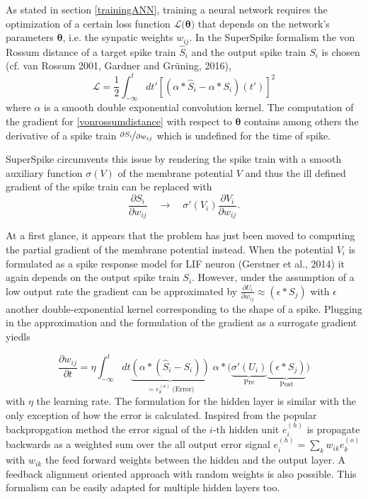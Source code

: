 As stated in section \ref{trainingANN}, training a neural network requires the optimization of a certain loss function $\mathcal{L(\mathbf{\theta)}}$ that depends on the network's parameters $\mathbf{\theta}$, i.e. the synpatic weights $w_{ij}$. In the SuperSpike formalism the von Rossum distance of a target spike train $\hat{S}_i$ and the output spike train $S_i$ is chosen (cf. van Rossum 2001, Gardner and Grüning, 2016),
\begin{equation}
\label{vonrossumdistance}
\mathcal{L} = \frac{1}{2} \int^t_{-\infty}dt' \left[\left(\alpha \ast \hat{S}_i - \alpha \ast S_i \right)(t')\right]^2
\end{equation}
where $\alpha$ is a smooth double exponential convolution kernel. The computation of the gradient for \ref{vonrossumdistance} with respect to $\mathbf{\theta}$ contains among others the derivative of a spike train $\nicefrac{\partial{S_i}}{\partial{w_{ij}}}$ which is undefined for the time of spike. 

SuperSpike circumvents this issue by rendering the spike train with a smooth auxiliary function $\sigma(V)$ of the membrane potential $V$ and thus the ill defined gradient of the spike train can be replaced with 
\begin{equation}
\frac{\partial S_i}{\partial w_{ij}} \quad \rightarrow \quad \sigma'(V_i)\frac{\partial V_i}{\partial w_{ij}}.
\end{equation}

At a first glance, it appears that the problem has just been moved to computing the partial gradient of the membrane potential instead. When the potential $V_i$ is formulated as a spike response model for LIF neuron (Gerstner et al., 2014) it again depends on the output spike train $S_i$. However, under the assumption of a low output rate the gradient can be approximated by $\frac{\partial U_i}{\partial w_{ij}} \approx (\epsilon \ast S_j)$ with $\epsilon$ another double-exponential kernel corresponding to the shape of a spike. Plugging in the approximation and the formulation of the gradient as a surrogate gradient yiedls

\begin{equation}
\frac{\partial w_{ij}}{\partial t} = \eta \int_{-\infty}^{t} dt
\underbrace{\left(\alpha \ast (\hat{S}_i - S_i)\right)}_{= e^{(o)}_k \; \text{(Error)}} 
\; \alpha \ast 
\Big(\underbrace{\sigma'(U_i)}_{\text{Pre}} 
\underbrace{\left(\epsilon \ast S_j\right)}_{\text{Post}}\Big)
\end{equation}
with $\eta$ the learning rate. The formulation for the hidden layer is similar with the only exception of how the error is calculated. Inspired from the popular backpropgation method the error signal of the $i \text{-th}$ hidden unit $e^{(h)}_i$ is propagate backwards as a weighted sum over the all output error signal $e^{(h)}_i = \sum_{k} w_{ik} e^{(o)}_k$ with $w_{ik}$ the feed forward weights between the hidden and the output layer. A feedback alignment oriented approach with random weights is also possible. This formalism can be easily adapted for multiple hidden layers too.


